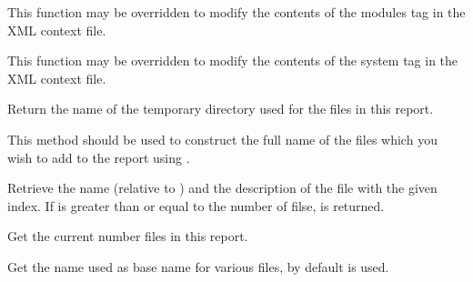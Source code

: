 \label{wxdebugreportdoaddloadedmodules}


This function may be overridden to modify the contents of the modules tag in
the XML context file.


\label{wxdebugreportdoaddsysteminfo}


This function may be overridden to modify the contents of the system tag in
the XML context file.


\label{wxdebugreportgetdirectory}


Return the name of the temporary directory used for the files in this report.

This method should be used to construct the full name of the files which you
wish to add to the report using .


\label{wxdebugreportgetfile}


Retrieve the name (relative to 
) and the description of the
file with the given index. If  is greater than or equal to the number of
filse, \false is returned.


\label{wxdebugreportgetfilescount}


Get the current number files in this report.


\label{wxdebugreportgetreportname}


Get the name used as base name for various files, by default 
 is used.


\label{wxdebugreportisok}



